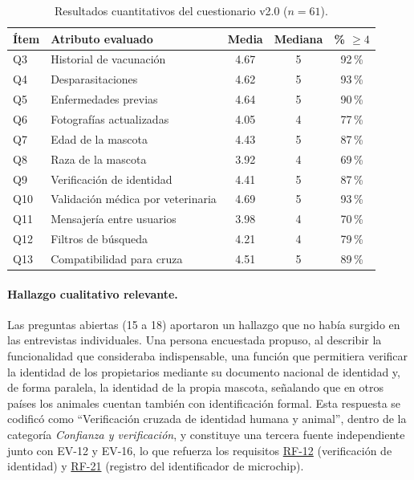 \documentclass[journal,onecolumn]{IEEEtran}
\begin{document}
	\begin{table}[H]
		\centering
		\caption{Resultados cuantitativos del cuestionario v2.0 ($n = 61$).}
		\label{tab:cuestionario-resultados}
		\small
		\begin{tabularx}{\textwidth}{@{}l X c c c@{}}
			\toprule
			\textbf{Ítem} & \textbf{Atributo evaluado} & \textbf{Media} & \textbf{Mediana} & \textbf{\% $\geq 4$} \\
			\midrule
			
			Q3 & Historial de vacunación & 4.67 & 5 & 92\,\% \\
			
			Q4 & Desparasitaciones & 4.62 & 5 & 93\,\% \\
			
			Q5 & Enfermedades previas & 4.64 & 5 & 90\,\% \\
			
			Q6 & Fotografías actualizadas & 4.05 & 4 & 77\,\% \\
			
			Q7 & Edad de la mascota & 4.43 & 5 & 87\,\% \\
			
			Q8 & Raza de la mascota & 3.92 & 4 & 69\,\% \\
			
			Q9 & Verificación de identidad & 4.41 & 5 & 87\,\% \\
			
			Q10 & Validación médica por veterinaria & 4.69 & 5 & 93\,\% \\
			
			Q11 & Mensajería entre usuarios & 3.98 & 4 & 70\,\% \\
			
			Q12 & Filtros de búsqueda & 4.21 & 4 & 79\,\% \\
			
			Q13 & Compatibilidad para cruza & 4.51 & 5 & 89\,\% \\
			
			\bottomrule
		\end{tabularx}
	\end{table}
	
	\paragraph{Hallazgo cualitativo relevante.}
	Las preguntas abiertas (15 a 18) aportaron un hallazgo que no había surgido
	en las entrevistas individuales. Una persona encuestada propuso, al describir
	la funcionalidad que consideraba indispensable, una función que permitiera
	verificar la identidad de los propietarios mediante su documento nacional de
	identidad y, de forma paralela, la identidad de la propia mascota, señalando
	que en otros países los animales cuentan también con identificación formal.
	Esta respuesta se codificó como \enquote{Verificación cruzada de identidad
		humana y animal}, dentro de la categoría \emph{Confianza y verificación}, y
	constituye una tercera fuente independiente junto con EV-12 y EV-16, lo que
	refuerza los requisitos \hyperref[tab:RF-12]{RF-12} (verificación de identidad) y \hyperref[tab:RF-21]{RF-21} (registro
	del identificador de microchip).
	
\end{document}
